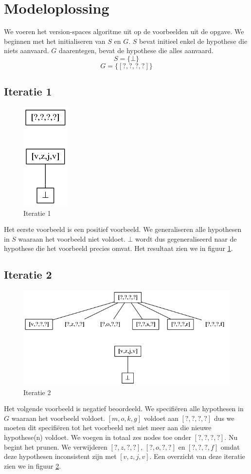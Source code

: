 \documentclass[alternative-exam.tex]{subfiles}
\begin{document}
\section{Modeloplossing}
We voeren het version-spaces algoritme uit op de voorbeelden uit de opgave. We beginnen met het initialiseren van $S$ en $G$. $S$ bevat initieel enkel de hypothese die niets aanvaard. $G$ daarentegen, bevat de hypothese die alles aanvaard.
\[
S = \{\bot\}
\]
\[
G = \{[?,?,?,?]\}
\]
\subsection{Iteratie 1}
\begin{figure}
[H]
\centering
\caption{Iteratie 1}
\label{iter_1}
\includegraphics[scale=0.5]{resources/graphs/iteration_1.png}
\end{figure}
Het eerste voorbeeld is een positief voorbeeld. We generaliseren alle hypothesen in $S$ waaraan het voorbeeld niet voldoet. $\bot$ wordt dus gegeneraliseerd naar de hypothese die het voorbeeld precies omvat. Het resultaat zien we in figuur \ref{iter_1}.

\subsection{Iteratie 2}
\begin{figure}
[H]
\centering
\caption{Iteratie 2}
\label{iter_2}
\includegraphics[scale=0.5]{resources/graphs/iteration_2.png}
\end{figure}
Het volgende voorbeeld is negatief beoordeeld. We specifi\"eren alle hypothesen in $G$ waaraan het voorbeeld voldoet. $[m,o,k,g]$ voldoet aan $[?,?,?,?]$ dus we moeten dit specifi\"eren tot het voorbeeld net niet meer aan die nieuwe hypothese(n) voldoet. We voegen in totaal zes nodes toe onder $[?,?,?,?]$. Nu begint het prunen. We verwijderen $[?,z,?,?]$, $[?,o,?,?]$ en $[?,?,?,f]$ omdat deze hypothesen inconsistent zijn met $[v,z,j,v]$. Een overzicht van deze iteratie zien we in figuur \ref{iter_2}.
\end{document}
